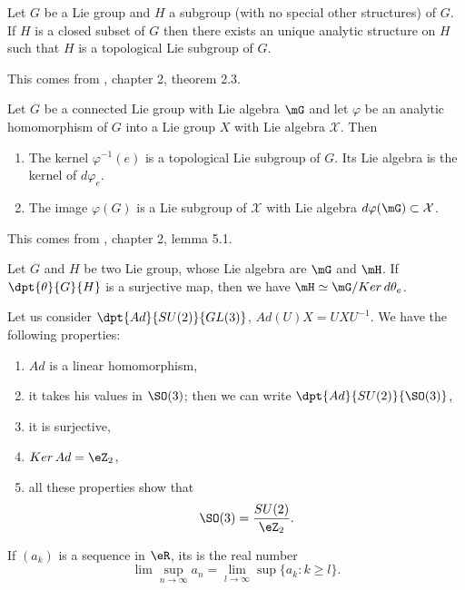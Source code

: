 \begin{theorem}
Let $G$ be a Lie group and $H$ a subgroup (with no special other structures) of $G$. If $H$ is a closed subset of $G$ then there exists an unique analytic structure on $H$ such that $H$ is a topological Lie subgroup of $G$.
\label{Helgason2.3}
\end{theorem}
This comes from \cite{Helgason}, chapter 2, theorem 2.3.

\begin{lemma}
Let $G$ be a connected Lie group with Lie algebra $\mG$ and let $\varphi$ be an analytic homomorphism of $G$ into a Lie group $X$ with Lie algebra $\mathcal{X}$. Then

\begin{enumerate}
\item The kernel $\varphi^{-1}(e)$ is a topological Lie subgroup of $G$. Its Lie algebra is the kernel of $d\varphi_e$.
\item The image $\varphi(G)$ is a Lie subgroup of $\mathcal{X}$ with Lie algebra $d\varphi(\mG)\subset\mathcal{X}$.
\end{enumerate}
\label{Helgason5.1}
\end{lemma}
This comes from \cite{Helgason}, chapter 2, lemma 5.1.

\begin{lemma}
Let $G$ and $H$ be two Lie group, whose Lie algebra are $\mG$ and $\mH$. If $\dpt{\theta}{G}{H}$ is a surjective map, then we have $\mH\simeq\mG/Ker\,d\theta_e$.
\label{1203r1}
\end{lemma}

\begin{theorem} \label{1503t1}
Let us consider $\dpt{Ad}{SU(2)}{GL(3)}$, $Ad(U)X=UXU^{-1}$. We have the following properties:

\begin{enumerate}
\item $Ad$ is a linear homomorphism,
\item it takes his values in $\SO(3)$; then we can write $\dpt{Ad}{SU(2)}{\SO(3)}$,
\item it is surjective,
\item $Ker\,Ad=\eZ_2$,
\item all these properties show that \[\SO(3)=\frac{SU(2)}{\eZ_2}.\]
\end{enumerate}
\end{theorem}

\begin{definition}
If $(a_k)$ is a sequence in $\eR$, its  is the real number
\[
  \lim\sup_{n\to\infty}a_n=\lim_{l\to\infty}\sup\{a_k:k\geq l\}.
\]
\end{definition}

